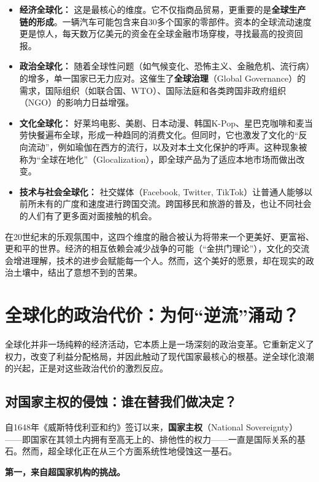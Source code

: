 \begin{itemize}
\item \textbf{经济全球化：} 这是最核心的维度。它不仅指商品贸易，更重要的是\textbf{全球生产链的形成}。一辆汽车可能包含来自30多个国家的零部件。资本的全球流动速度更是惊人，每天数万亿美元的资金在全球金融市场穿梭，寻找最高的投资回报。
\item \textbf{政治全球化：} 随着全球性问题（如气候变化、恐怖主义、金融危机、流行病）的增多，单一国家已无力应对。这催生了\textbf{全球治理}（Global Governance）的需求，国际组织（如联合国、WTO）、国际法庭和各类跨国非政府组织（NGO）的影响力日益增强。
\item \textbf{文化全球化：} 好莱坞电影、美剧、日本动漫、韩国K-Pop、星巴克咖啡和麦当劳快餐遍布全球，形成一种趋同的消费文化。但同时，它也激发了文化的“反向流动”，例如瑜伽在西方的流行，以及对本土文化保护的呼声。这种现象被称为“全球在地化”（Glocalization），即全球产品为了适应本地市场而做出改变。
\item \textbf{技术与社会全球化：} 社交媒体（Facebook, Twitter, TikTok）让普通人能够以前所未有的广度和速度进行跨国交流。跨国移民和旅游的普及，也让不同社会的人们有了更多面对面接触的机会。
\end{itemize}

在20世纪末的乐观氛围中，这四个维度的融合被认为将带来一个更美好、更富裕、更和平的世界。经济的相互依赖会减少战争的可能（“金拱门理论”），文化的交流会增进理解，技术的进步会赋能每一个人。然而，这个美好的愿景，却在现实的政治土壤中，结出了意想不到的苦果。

\section{ 全球化的政治代价：为何“逆流”涌动？}

全球化并非一场纯粹的经济活动，它本质上是一场深刻的政治变革。它重新定义了权力，改变了利益分配格局，并因此触动了现代国家最核心的根基。逆全球化浪潮的兴起，正是对这些政治代价的激烈反应。

\subsection{对国家主权的侵蚀：谁在替我们做决定？}

自1648年《威斯特伐利亚和约》签订以来，\textbf{国家主权}（National Sovereignty）——即国家在其领土内拥有至高无上的、排他性的权力——一直是国际关系的基石。然而，超全球化正在从三个方面系统性地侵蚀这一基石。

\textbf{第一，来自超国家机构的挑战。}

